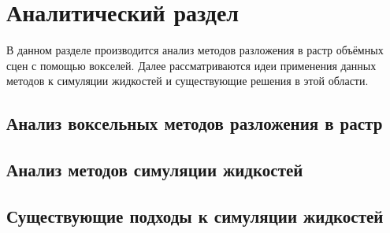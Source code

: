 \chapter{Аналитический раздел}
\label{cha:analysis}
%
%
В данном разделе производится анализ методов разложения в растр объёмных сцен
с помощью вокселей. Далее рассматриваются идеи применения данных методов к симуляции жидкостей и существующие решения в этой области.

\section{Анализ воксельных методов разложения в растр}


\section{Анализ методов симуляции жидкостей}


\section{Существующие подходы к симуляции жидкостей}


